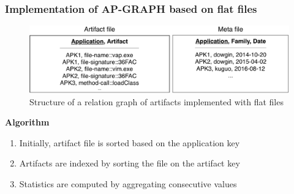 \begin{frame}
    \frametitle{Implementation of AP-GRAPH based on flat files}

    \begin{figure}[!ht]
        \includegraphics[width=\textwidth]{figures/apgraph/implementation.pdf}
        \caption{\footnotesize{Structure of a relation graph of artifacts implemented with flat files}}
    \end{figure}

    \vspace{-5pt}

    \begin{block}{}
        \centering
        \textbf{Algorithm}
    \end{block}

    \begin{enumerate}
        \item Initially, artifact file is sorted based on the application key
        \item Artifacts are indexed by sorting the file on the artifact key
        \item Statistics are computed by aggregating consecutive values
    \end{enumerate}

\end{frame}

